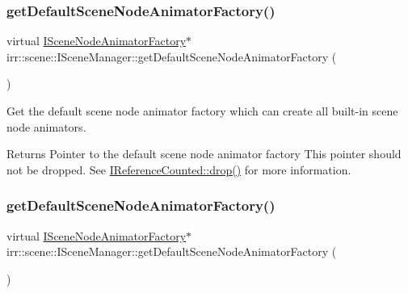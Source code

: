 \subsubsection{\texorpdfstring{get\+Default\+Scene\+Node\+Animator\+Factory()}{getDefaultSceneNodeAnimatorFactory()}\hspace{0.1cm}{\footnotesize\ttfamily [1/2]}}
{\footnotesize\ttfamily virtual \hyperlink{classirr_1_1scene_1_1ISceneNodeAnimatorFactory}{I\+Scene\+Node\+Animator\+Factory}$\ast$ irr\+::scene\+::\+I\+Scene\+Manager\+::get\+Default\+Scene\+Node\+Animator\+Factory (\begin{DoxyParamCaption}{ }\end{DoxyParamCaption})\hspace{0.3cm}{\ttfamily [pure virtual]}}



Get the default scene node animator factory which can create all built-\/in scene node animators. 

\begin{DoxyReturn}{Returns}
Pointer to the default scene node animator factory This pointer should not be dropped. See \hyperlink{classirr_1_1IReferenceCounted_a03856a09355b89d178090c4a5f738543}{I\+Reference\+Counted\+::drop()} for more information. 
\end{DoxyReturn}
\mbox{\label{classirr_1_1scene_1_1ISceneManager_adeb3d24c8ffafd5e671f344931a0b3a5}} 
\subsubsection{\texorpdfstring{get\+Default\+Scene\+Node\+Animator\+Factory()}{getDefaultSceneNodeAnimatorFactory()}\hspace{0.1cm}{\footnotesize\ttfamily [2/2]}}
{\footnotesize\ttfamily virtual \hyperlink{classirr_1_1scene_1_1ISceneNodeAnimatorFactory}{I\+Scene\+Node\+Animator\+Factory}$\ast$ irr\+::scene\+::\+I\+Scene\+Manager\+::get\+Default\+Scene\+Node\+Animator\+Factory (\begin{DoxyParamCaption}{ }\end{DoxyParamCaption})\hspace{0.3cm}{\ttfamily [pure virtual]}}



